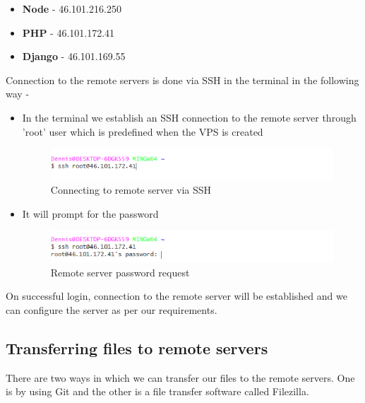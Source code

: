 \documentclass[../thesis.tex]{subfiles}
\begin{document}
	\begin{itemize}
		\item \textbf{Node} - 46.101.216.250
		\smallskip
		\item \textbf{PHP} - 46.101.172.41
		\smallskip
		\item \textbf{Django} - 46.101.169.55
	\end{itemize}
	Connection to the remote servers is done via SSH in the terminal in the following way -
	\begin{itemize}
		\item In the terminal we establish an SSH connection to the remote server through 'root' user which is predefined when the VPS is created
		\begin{figure}[H]
			\centering
			\includegraphics[width=1\textwidth]{../images/ssh1.png}
			\caption{Connecting to remote server via SSH}
			\label{rys1}
		\end{figure}
		\item It will prompt for the password
		\newline
		\begin{figure}[H]
			\centering
			\includegraphics[width=1\textwidth]{../images/ssh2.png}
			\caption{Remote server password request}
			\label{rys1}
		\end{figure}
	\end{itemize}
	On successful login, connection to the remote server will be established and we can configure the server as per our requirements.
	\subsection*{Transferring files to remote servers}
	There are two ways in which we can transfer our files to the remote servers. One is by using Git and the other is a file transfer software called Filezilla.
	
\end{document}
